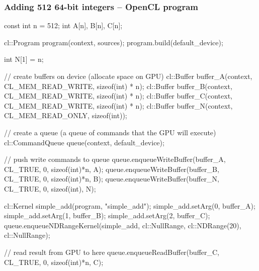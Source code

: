 \documentclass{beamer}
\begin{document}
\begin{frame}[fragile]
\frametitle{Adding 512 64-bit integers -- OpenCL program}
\begin{semiverbatim}
\tiny
const int n = 512;
int A[n], B[n], C[n];

cl::Program program(context, sources);
program.build({default_device});

int N[1] = {n};

// create buffers on device (allocate space on GPU)
cl::Buffer buffer_A(context, CL_MEM_READ_WRITE, sizeof(int) * n);
cl::Buffer buffer_B(context, CL_MEM_READ_WRITE, sizeof(int) * n);
cl::Buffer buffer_C(context, CL_MEM_READ_WRITE, sizeof(int) * n);
cl::Buffer buffer_N(context, CL_MEM_READ_ONLY,  sizeof(int));

// create a queue (a queue of commands that the GPU will execute)
cl::CommandQueue queue(context, default_device);

// push write commands to queue
queue.enqueueWriteBuffer(buffer_A, CL_TRUE, 0, sizeof(int)*n, A);
queue.enqueueWriteBuffer(buffer_B, CL_TRUE, 0, sizeof(int)*n, B);
queue.enqueueWriteBuffer(buffer_N, CL_TRUE, 0, sizeof(int),   N);

cl::Kernel simple_add(program, "simple_add");
simple_add.setArg(0, buffer_A);
simple_add.setArg(1, buffer_B);
simple_add.setArg(2, buffer_C);
queue.enqueueNDRangeKernel(simple_add, cl::NullRange, cl::NDRange(20), cl::NullRange);

// read result from GPU to here
queue.enqueueReadBuffer(buffer_C, CL_TRUE, 0, sizeof(int)*n, C);

\end{semiverbatim}
\end{frame}
\end{document}
